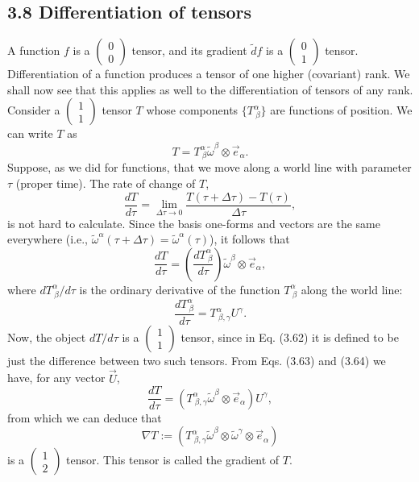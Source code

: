 \documentclass[12pt]{book}
\begin{document}
    \subsection{3.8 Differentiation of tensors}
    A function \(f\) is a \(\left(\begin{array}{c} 0 \\ 0 \end{array}\right)\) tensor, and its gradient \(\tilde{d}f\) is a \(\left(\begin{array}{c} 0 \\ 1 \end{array}\right)\) tensor. Differentiation of a function produces a tensor of one higher (covariant) rank. We shall now see that this applies as well to the differentiation of tensors of any rank. 
    Consider a \(\left(\begin{array}{c} 1 \\ 1 \end{array}\right)\) tensor \(T\) whose components \(\{T^\alpha_{\ \beta}\}\) are functions of position. We can write \(T\) as
    \[
    T = T^\alpha_{\ \beta} \tilde{\omega}^\beta \otimes \vec{e}_\alpha. \tag{3.61}
    \]
    Suppose, as we did for functions, that we move along a world line with parameter \(\tau\) (proper time). The rate of change of \(T\),
    \[
    \frac{dT}{d\tau} = \lim_{\Delta \tau \rightarrow 0} \frac{T(\tau + \Delta \tau) - T(\tau)}{\Delta \tau}, \tag{3.62}
    \]
    is not hard to calculate. Since the basis one-forms and vectors are the same everywhere (i.e., \(\tilde{\omega}^\alpha(\tau + \Delta \tau) = \tilde{\omega}^\alpha(\tau)\)), it follows that
    \[
    \frac{dT}{d\tau} = \left(\frac{dT^\alpha_{\ \beta}}{d\tau}\right) \tilde{\omega}^\beta \otimes \vec{e}_\alpha, \tag{3.63}
    \]
    where \(dT^\alpha_{\ \beta}/d\tau\) is the ordinary derivative of the function \(T^\alpha_{\ \beta}\) along the world line:
    \[
    \frac{dT^\alpha_{\ \beta}}{d\tau} = T^\alpha_{\ \beta, \gamma} U^\gamma. \tag{3.64}
    \]
    Now, the object \(dT/d\tau\) is a \(\left(\begin{array}{c} 1 \\ 1 \end{array}\right)\) tensor, since in Eq. (3.62) it is defined to be just the difference between two such tensors. From Eqs. (3.63) and (3.64) we have, for any vector \(\vec{U}\),
    \[
    \frac{dT}{d\tau} = \left(T^\alpha_{\ \beta, \gamma} \tilde{\omega}^\beta \otimes \vec{e}_\alpha\right) U^\gamma, \tag{3.65}
    \]
    from which we can deduce that
    \[
    \nabla T := \left(T^\alpha_{\ \beta, \gamma} \tilde{\omega}^\beta \otimes \tilde{\omega}^\gamma \otimes \vec{e}_\alpha\right) \tag{3.66}
    \]
    is a \(\left(\begin{array}{c} 1 \\ 2 \end{array}\right)\) tensor. This tensor is called the gradient of \(T\).
    
\end{document}
